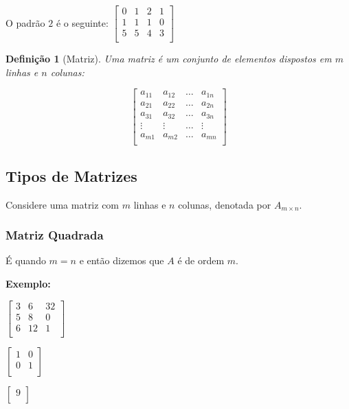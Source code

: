 \documentclass[oneside,a4paper,12pt]{article}
\newtheorem{definition}{Definição}[section]
\begin{document}
O padrão $2$ é o seguinte:
	$\left[
	\begin{array}{cccc}
	0			&	1		&	2		&	1	\\	
	1			&	1		&	1		&	0	\\
	5			&	5		&	4		&	3	\\
	\end{array}
	\right]$


\begin{definition}[Matriz]
	Uma matriz é um conjunto de elementos dispostos em $m$ linhas e $n$ colunas:
	
	$$
	\left[
	\begin{array}{cccc}
	a_{11}	&	a_{12}	&	\dots	&	a_{1n}	\\
	a_{21}	&	a_{22}	&	\dots	&	a_{2n}	\\
	a_{31}	&	a_{32}	&	\dots	&	a_{3n}	\\
	\vdots	&	\vdots	&	\dots	&	\vdots	\\
	a_{m1}	&	a_{m2}	&	\dots	&	a_{mn}	\\
	\end{array}
	\right]
	$$
\end{definition}

\subsection{Tipos de Matrizes}

Considere uma matriz com $m$ linhas e $n$ colunas, denotada por $A_{m \times n}$.

\subsubsection{Matriz Quadrada}
É quando $m=n$ e então dizemos que $A$ é de ordem $m$.

\textbf{Exemplo: }

\begin{multicols}{3}
	$
	\left[
	\begin{array}{ccc}
	3	&	6	&	32	\\
	5	&	8	&	0	\\
	6	&	12	&	1	\\
	\end{array}
	\right]
	$
	
	$
	\left[
	\begin{array}{cc}
	1	&	0	\\
	0	&	1	\\
	\end{array}
	\right]
	$
	
	$
	\left[
	\begin{array}{c}
	9	\\
	\end{array}
	\right]
	$
\end{multicols}
\end{document}
